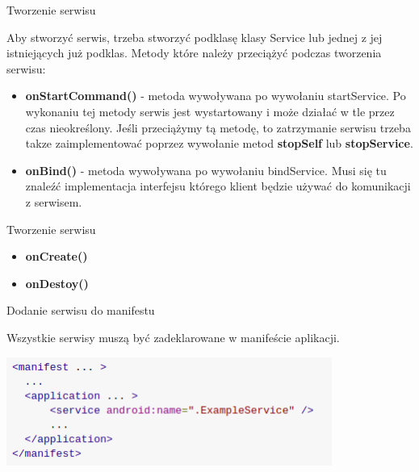 \documentclass{beamer}
\begin{document}
\begin{frame}{Tworzenie serwisu}
	\begin{block}{}
		Aby stworzyć serwis, trzeba stworzyć podklasę klasy Service lub jednej z jej istniejących już podklas.
		Metody które należy przeciążyć podczas tworzenia serwisu:
		\begin{itemize}
			\item \textbf{onStartCommand()} - metoda wywoływana po wywołaniu startService. Po wykonaniu tej metody serwis jest wystartowany i może działać w tle przez czas nieokreślony. Jeśli przeciążymy tą metodę, to zatrzymanie serwisu trzeba takze zaimplementować poprzez wywołanie metod \textbf{stopSelf} lub \textbf{stopService}.
			\item \textbf{onBind()} - metoda wywoływana po wywołaniu bindService. Musi się tu znaleźć implementacja interfejsu którego klient będzie używać do komunikacji z serwisem.
		\end{itemize}
	\end{block}
\end{frame}

\begin{frame}{Tworzenie serwisu}
	\begin{block}{}
		\begin{itemize}
			\item \textbf{onCreate()}
			\item \textbf{onDestoy()}
		\end{itemize}
	\end{block}
\end{frame}

\begin{frame}{Dodanie serwisu do manifestu}
	\begin{block}{}
		Wszystkie serwisy muszą być zadeklarowane w manifeście aplikacji.
	\end{block}
	\includegraphics[width=0.8\textwidth]{service-manifest}
\end{frame}
\end{document}

